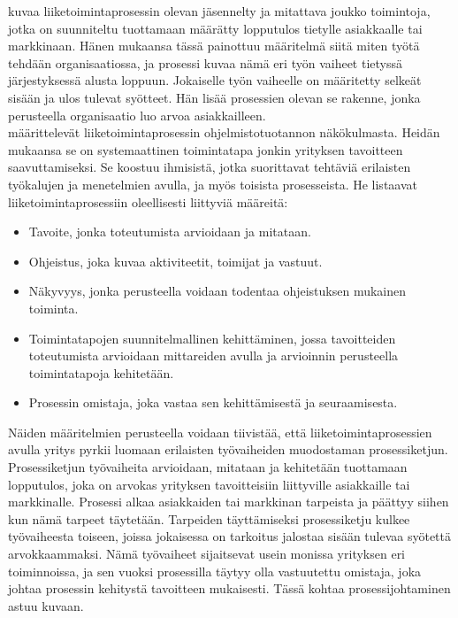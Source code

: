 \documentclass[finnish,12pt,a4paper,pdftex]{article}
\begin{document}
\cite{davenport} kuvaa liiketoimintaprosessin olevan jäsennelty ja mitattava joukko toimintoja, jotka on suunniteltu tuottamaan määrätty lopputulos tietylle asiakkaalle tai markkinaan. Hänen mukaansa tässä painottuu määritelmä siitä miten työtä tehdään organisaatiossa, ja prosessi kuvaa nämä eri työn vaiheet tietyssä järjestyksessä alusta loppuun. Jokaiselle työn vaiheelle on määritetty selkeät sisään ja ulos tulevat syötteet. Hän lisää prosessien olevan se rakenne, jonka perusteella organisaatio luo arvoa asiakkailleen.\\

\cite{okaytannot} määrittelevät liiketoimintaprosessin ohjelmistotuotannon näkökulmasta. Heidän mukaansa se on systemaattinen toimintatapa jonkin yrityksen tavoitteen saavuttamiseksi. Se koostuu ihmisistä, jotka suorittavat tehtäviä erilaisten työkalujen ja menetelmien avulla, ja myös toisista prosesseista. He listaavat liiketoimintaprosessiin oleellisesti liittyviä määreitä:

\begin{itemize}
\setlength{\itemsep}{0pt}
    \item Tavoite, jonka toteutumista arvioidaan ja mitataan.
    \item Ohjeistus, joka kuvaa aktiviteetit, toimijat ja vastuut.
    \item Näkyvyys, jonka perusteella voidaan todentaa ohjeistuksen mukainen toiminta.
    \item Toimintatapojen suunnitelmallinen kehittäminen, jossa tavoitteiden toteutumista arvioidaan mittareiden avulla ja arvioinnin perusteella toimintatapoja kehitetään.
    \item Prosessin omistaja, joka vastaa sen kehittämisestä ja seuraamisesta.
\end{itemize}

Näiden määritelmien perusteella voidaan tiivistää, että liiketoimintaprosessien avulla yritys pyrkii luomaan erilaisten työvaiheiden muodostaman prosessiketjun. Prosessiketjun työvaiheita arvioidaan, mitataan ja kehitetään tuottamaan lopputulos, joka on arvokas yrityksen tavoitteisiin liittyville asiakkaille tai markkinalle. Prosessi alkaa asiakkaiden tai markkinan tarpeista ja päättyy siihen kun nämä tarpeet täytetään. Tarpeiden täyttämiseksi prosessiketju kulkee työvaiheesta toiseen, joissa jokaisessa on tarkoitus jalostaa sisään tulevaa syötettä arvokkaammaksi. Nämä työvaiheet sijaitsevat usein monissa yrityksen eri toiminnoissa, ja sen vuoksi prosessilla täytyy olla vastuutettu omistaja, joka johtaa prosessin kehitystä tavoitteen mukaisesti. Tässä kohtaa prosessijohtaminen astuu kuvaan.  \\
\end{document}
